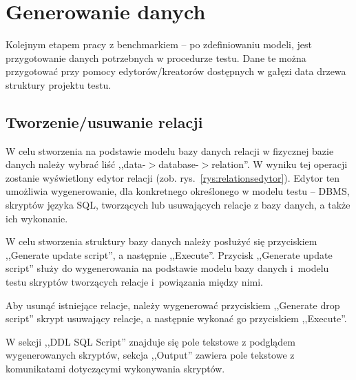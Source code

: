 \section{Generowanie danych}
Kolejnym etapem pracy z benchmarkiem -- po zdefiniowaniu modeli, jest przygotowanie
danych potrzebnych w procedurze testu. Dane te można przygotować przy pomocy
edytorów/kreatorów dostępnych w gałęzi data drzewa struktury projektu testu.
\subsection{Tworzenie/usuwanie relacji}
W celu stworzenia na podstawie modelu bazy danych relacji w fizycznej bazie danych
należy wybrać liść ,,data-$>$database-$>$relation''. W wyniku tej operacji zostanie
wyświetlony edytor relacji (zob. rys.~\ref{rys:relationsedytor}).
Edytor ten umożliwia wygenerowanie, dla konkretnego określonego w modelu testu -- DBMS,
skryptów języka SQL, tworzących lub usuwających relacje z bazy danych, a także ich wykonanie.

W celu stworzenia struktury bazy danych należy posłużyć się przyciskiem ,,Generate update script'',
a następnie ,,Execute''. Przycisk ,,Generate update script'' służy do wygenerowania na 
podstawie modelu bazy danych i~modelu testu skryptów tworzących relacje i~powiązania między nimi.

Aby usunąć istniejące relacje, należy wygenerować przyciskiem ,,Generate drop script''
skrypt usuwający relacje, a następnie wykonać go przyciskiem ,,Execute''.

W sekcji ,,DDL SQL Script'' znajduje się pole tekstowe z podglądem wygenerowanych skryptów,
sekcja ,,Output'' zawiera pole tekstowe z komunikatami dotyczącymi wykonywania skryptów.

